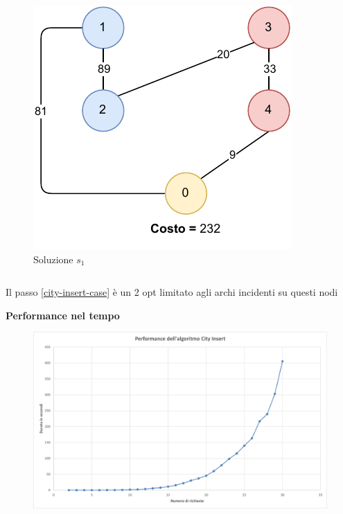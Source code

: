 \documentclass[9pt]{beamer}
\begin{document}
\begin{frame}[allowframebreaks]{\subsecname}
{\begin{columns}[T,onlytextwidth]
\begin{figure}[h]
		\includegraphics[height=0.25\textheight]
		{../images/graph-greedy-pickup-first-solution-tsppd-with-two-customers}	
		\caption{Soluzione $s_1$}
		\end{figure}
	\end{columns}

	Il passo \ref{city-insert-case} è un 2 opt limitato agli archi incidenti su questi nodi}
	
\framebreak

	\textbf{Performance nel tempo}
      	\begin{figure}[h]
	\centering
	\includegraphics[width=\textwidth]
	{../charts/09 Performance dell'algoritmo City Insert}
	\end{figure}

\end{frame}
\end{document}
